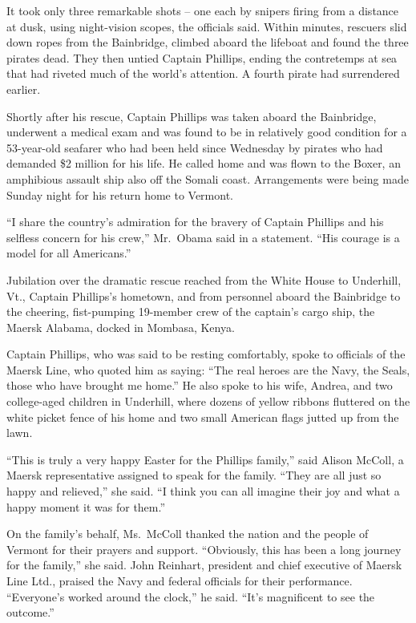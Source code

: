 \documentclass[12pt,a4paper,onecolumn]{article}
\begin{document}
It took only three remarkable shots -- one each by snipers firing from a distance at dusk, using
night-vision scopes, the officials said. Within minutes, rescuers slid down ropes from the
Bainbridge, climbed aboard the lifeboat and found the three pirates dead. They then untied Captain
Phillips, ending the contretemps at sea that had riveted much of the world's attention. A fourth
pirate had surrendered earlier.

Shortly after his rescue, Captain Phillips was taken aboard the Bainbridge, underwent a medical exam
and was found to be in relatively good condition for a 53-year-old seafarer who had been held since
Wednesday by pirates who had demanded \$2 million for his life. He called home and was flown to the
Boxer, an amphibious assault ship also off the Somali coast. Arrangements were being made Sunday
night for his return home to Vermont.

``I share the country's admiration for the bravery of Captain Phillips and his selfless concern for
his crew,'' Mr.~Obama said in a statement. ``His courage is a model for all Americans.''

Jubilation over the dramatic rescue reached from the White House to Underhill, Vt., Captain
Phillips's hometown, and from personnel aboard the Bainbridge to the cheering, fist-pumping
19-member crew of the captain's cargo ship, the Maersk Alabama, docked in Mombasa, Kenya.

Captain Phillips, who was said to be resting comfortably, spoke to officials of the Maersk Line, who
quoted him as saying: ``The real heroes are the Navy, the Seals, those who have brought me home.''
He also spoke to his wife, Andrea, and two college-aged children in Underhill, where dozens of
yellow ribbons fluttered on the white picket fence of his home and two small American flags jutted
up from the lawn.

``This is truly a very happy Easter for the Phillips family,'' said Alison McColl, a Maersk
representative assigned to speak for the family. ``They are all just so happy and relieved,'' she
said. ``I think you can all imagine their joy and what a happy moment it was for them.''

On the family's behalf, Ms.~McColl thanked the nation and the people of Vermont for their prayers
and support. ``Obviously, this has been a long journey for the family,'' she said. John Reinhart,
president and chief executive of Maersk Line Ltd., praised the Navy and federal officials for their
performance. ``Everyone's worked around the clock,'' he said. ``It's magnificent to see the
outcome.''
\end{document}

